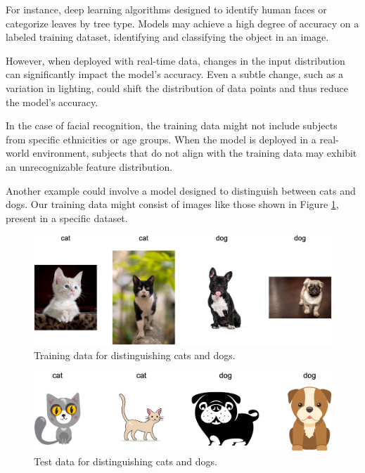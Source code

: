 For instance, deep learning algorithms designed to identify human faces or categorize leaves by tree type. Models may achieve a high degree of accuracy on a labeled training dataset, identifying and classifying the object in an image.
 
However, when deployed with real-time data, changes in the input distribution can significantly impact the model's accuracy. Even a subtle change, such as a variation in lighting, could shift the distribution of data points and thus reduce the model's accuracy.

In the case of facial recognition, the training data might not include subjects from specific ethnicities or age groups. When the model is deployed in a real-world environment, subjects that do not align with the training data may exhibit an unrecognizable feature distribution.

Another example could involve a model designed to distinguish between cats and dogs. Our training data might consist of images like those shown in Figure \cref{cani-gatti-tr}, present in a specific dataset.

\vspace{0.5cm}
\begin{figure}[h!]
    \centering
    \includegraphics[width=1\textwidth]{../src/assets/cat-dog-train.png} 
    \caption{Training data for distinguishing cats and dogs.}
    \label{cani-gatti-tr}
\end{figure}

\begin{figure}[h!]
    \centering
    \includegraphics[width=1\textwidth]{../src/assets/cat-dog-test.png} 
    \caption{Test data for distinguishing cats and dogs.}
    \label{cani-gatti-ts}
\end{figure}

